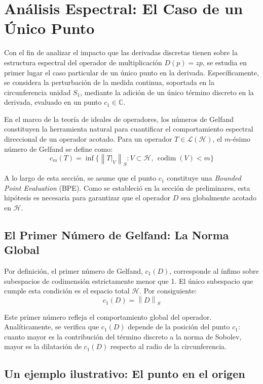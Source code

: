 \documentclass[12pt,a4paper]{article}
\theoremstyle{definition}
\theoremstyle{remark}
\newcommand{\C}{\mathbb{C}}
\newcommand{\norm}[1]{\left\| #1 \right\|_S}
\begin{document}
\section{Análisis Espectral: El Caso de un Único Punto}

Con el fin de analizar el impacto que las derivadas discretas tienen sobre la estructura espectral del operador de multiplicación $D(p) = zp$, se estudia en primer lugar el caso particular de un único punto en la derivada. Específicamente, se considera la perturbación de la medida continua, soportada en la circunferencia unidad $S_1$, mediante la adición de un único término discreto en la derivada, evaluado en un punto $c_1 \in \C$.

En el marco de la teoría de ideales de operadores, los números de Gelfand constituyen la herramienta natural para cuantificar el comportamiento espectral direccional de un operador acotado. Para un operador $T \in \mathcal{L}(\mathcal{H})$, el $m$-ésimo número de Gelfand se define como:
\begin{equation}
    c_m(T) = \inf \{ \norm{T|_V} : V \subset \mathcal{H}, \, \operatorname{codim}(V) < m \}
\end{equation}

A lo largo de esta sección, se asume que el punto $c_1$ constituye una \textit{Bounded Point Evaluation} (BPE). Como se estableció en la sección de preliminares, esta hipótesis es necesaria para garantizar que el operador $D$ sea globalmente acotado en $\mathcal{H}$.

\subsection{El Primer Número de Gelfand: La Norma Global}

Por definición, el primer número de Gelfand, $c_1(D)$, corresponde al ínfimo sobre subespacios de codimensión estrictamente menor que 1. El único subespacio que cumple esta condición es el espacio total $\mathcal{H}$. Por consiguiente:
$$ c_1(D) = \norm{D} $$

Este primer número refleja el comportamiento global del operador. Analíticamente, se verifica que $c_1(D)$ depende de la posición del punto $c_1$: cuanto mayor es la contribución del término discreto a la norma de Sobolev, mayor es la dilatación de $c_1(D)$ respecto al radio de la circunferencia.

\subsection{Un ejemplo ilustrativo: El punto en el origen}
\end{document}
